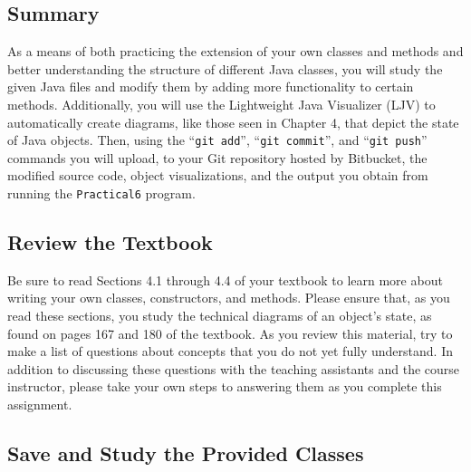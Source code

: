 


\vspace*{-.2in}
\subsection*{Summary}
\vspace*{-.05in}

As a means of both practicing the extension of your own classes and methods and better understanding the structure of
different Java classes, you will study the given Java files and modify them by adding more functionality to certain
methods.  Additionally, you will use the Lightweight Java Visualizer (LJV) to automatically create diagrams, like those
seen in Chapter 4, that depict the state of Java objects.  Then, using the ``{\tt git add}'', ``{\tt git commit}'', and
``{\tt git push}'' commands you will upload, to your Git repository hosted by Bitbucket, the modified source code,
object visualizations, and the output you obtain from running the {\tt Practical6} program.

\vspace*{-.15in}
\subsection*{Review the Textbook}
\vspace*{-.05in}

Be sure to read Sections 4.1 through 4.4 of your textbook to learn more about writing your own classes, constructors, and
methods.  Please ensure that, as you read these sections, you study the technical diagrams of an object's state, as
found on pages 167 and 180 of the textbook. As you review this material, try to make a list of questions about concepts
that you do not yet fully understand.  In addition to discussing these questions with the teaching assistants and the
course instructor, please take your own steps to answering them as you complete this assignment.

\vspace*{-.15in}
\subsection*{Save and Study the Provided Classes}
\vspace*{-.05in}

